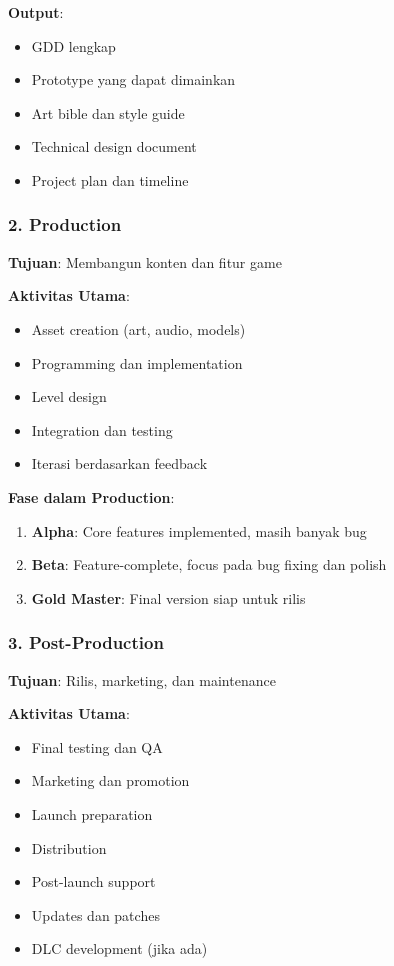 \textbf{Output}:
\begin{itemize}
\item GDD lengkap
\item Prototype yang dapat dimainkan
\item Art bible dan style guide
\item Technical design document
\item Project plan dan timeline
\end{itemize}

\subsubsection{2. Production}

\textbf{Tujuan}: Membangun konten dan fitur game

\textbf{Aktivitas Utama}:
\begin{itemize}
\item Asset creation (art, audio, models)
\item Programming dan implementation
\item Level design
\item Integration dan testing
\item Iterasi berdasarkan feedback
\end{itemize}

\textbf{Fase dalam Production}:
\begin{enumerate}
\item \textbf{Alpha}: Core features implemented, masih banyak bug
\item \textbf{Beta}: Feature-complete, focus pada bug fixing dan polish
\item \textbf{Gold Master}: Final version siap untuk rilis
\end{enumerate}

\subsubsection{3. Post-Production}

\textbf{Tujuan}: Rilis, marketing, dan maintenance

\textbf{Aktivitas Utama}:
\begin{itemize}
\item Final testing dan QA
\item Marketing dan promotion
\item Launch preparation
\item Distribution
\item Post-launch support
\item Updates dan patches
\item DLC development (jika ada)
\end{itemize}

